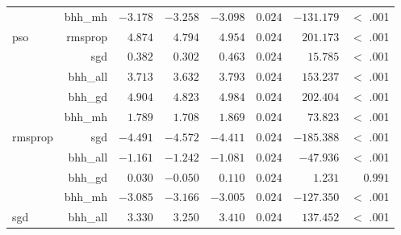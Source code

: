 \begin{table}[htbp]
{\begin{tabular}{lrrrrrrr}
			                     & bhh\_mh              & $-3.178$             & $-3.258$                                        & $-3.098$             & $0.024$              & $-131.179$           & $<$ .001    \\
			pso                  & rmsprop              & $4.874$              & $4.794$                                         & $4.954$              & $0.024$              & $201.173$            & $<$ .001    \\
			$ $                  & sgd                  & $0.382$              & $0.302$                                         & $0.463$              & $0.024$              & $15.785$             & $<$ .001    \\
			                     & bhh\_all             & $3.713$              & $3.632$                                         & $3.793$              & $0.024$              & $153.237$            & $<$ .001    \\
			                     & bhh\_gd              & $4.904$              & $4.823$                                         & $4.984$              & $0.024$              & $202.404$            & $<$ .001    \\
			                     & bhh\_mh              & $1.789$              & $1.708$                                         & $1.869$              & $0.024$              & $73.823$             & $<$ .001    \\
			rmsprop              & sgd                  & $-4.491$             & $-4.572$                                        & $-4.411$             & $0.024$              & $-185.388$           & $<$ .001    \\
			$ $                  & bhh\_all             & $-1.161$             & $-1.242$                                        & $-1.081$             & $0.024$              & $-47.936$            & $<$ .001    \\
			                     & bhh\_gd              & $0.030$              & $-0.050$                                        & $0.110$              & $0.024$              & $1.231$              & $0.991$     \\
			                     & bhh\_mh              & $-3.085$             & $-3.166$                                        & $-3.005$             & $0.024$              & $-127.350$           & $<$ .001    \\
			sgd                  & bhh\_all             & $3.330$              & $3.250$                                         & $3.410$              & $0.024$              & $137.452$            & $<$ .001    \\

\end{tabular}}
\end{table}
